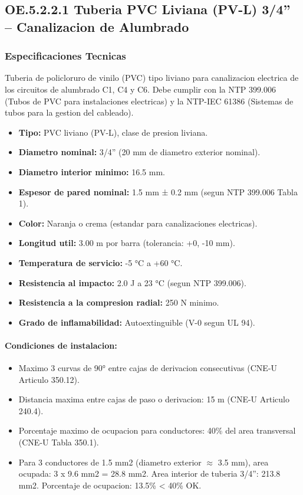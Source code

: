 \subsection{OE.5.2.2.1 Tuberia PVC Liviana (PV-L) 3/4'' -- Canalizacion de Alumbrado}

\subsubsection{Especificaciones Tecnicas}

Tuberia de policloruro de vinilo (PVC) tipo liviano para canalizacion electrica de los circuitos de alumbrado C1, C4 y C6. Debe cumplir con la NTP 399.006 (Tubos de PVC para instalaciones electricas) y la NTP-IEC 61386 (Sistemas de tubos para la gestion del cableado).

\begin{itemize}[nosep]
  \item \textbf{Tipo:} PVC liviano (PV-L), clase de presion liviana.
  \item \textbf{Diametro nominal:} 3/4'' (20 mm de diametro exterior nominal).
  \item \textbf{Diametro interior minimo:} 16.5 mm.
  \item \textbf{Espesor de pared nominal:} 1.5 mm ± 0.2 mm (segun NTP 399.006 Tabla 1).
  \item \textbf{Color:} Naranja o crema (estandar para canalizaciones electricas).
  \item \textbf{Longitud util:} 3.00 m por barra (tolerancia: +0, -10 mm).
  \item \textbf{Temperatura de servicio:} -5 °C a +60 °C.
  \item \textbf{Resistencia al impacto:} 2.0 J a 23 °C (segun NTP 399.006).
  \item \textbf{Resistencia a la compresion radial:} 250 N minimo.
  \item \textbf{Grado de inflamabilidad:} Autoextinguible (V-0 segun UL 94).
\end{itemize}

\paragraph{Condiciones de instalacion:}
\begin{itemize}[nosep]
  \item Maximo 3 curvas de 90° entre cajas de derivacion consecutivas (CNE-U Articulo 350.12).
  \item Distancia maxima entre cajas de paso o derivacion: 15 m (CNE-U Articulo 240.4).
  \item Porcentaje maximo de ocupacion para conductores: 40\% del area transversal (CNE-U Tabla 350.1).
  \item Para 3 conductores de 1.5 mm2 (diametro exterior $\approx$ 3.5 mm), area ocupada: 3 x 9.6 mm2 = 28.8 mm2. Area interior de tuberia 3/4'': 213.8 mm2. Porcentaje de ocupacion: 13.5\% < 40\% OK.
\end{itemize}

